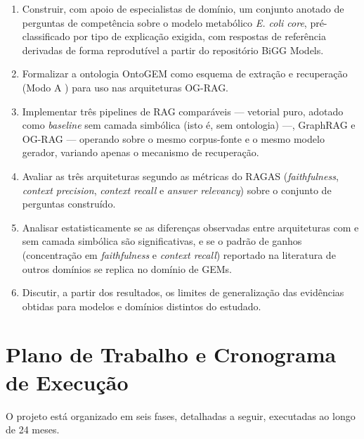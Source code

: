 \documentclass{article}
\begin{document}
	\begin{enumerate}
		\item Construir, com apoio de especialistas de domínio, um conjunto anotado de perguntas de competência sobre o modelo metabólico \textit{E. coli core}, pré-classificado por tipo de explicação exigida, com respostas de referência derivadas de forma reprodutível a partir do repositório BiGG Models.
		\item Formalizar a ontologia OntoGEM como esquema de extração e recuperação (Modo A \cite{sharma2025ograg}) para uso nas arquiteturas OG-RAG.
		\item Implementar três pipelines de RAG comparáveis --- vetorial puro, adotado como \textit{baseline} sem camada simbólica (isto é, sem ontologia) ---, GraphRAG e OG-RAG --- operando sobre o mesmo corpus-fonte e o mesmo modelo gerador, variando apenas o mecanismo de recuperação. %
		\item Avaliar as três arquiteturas segundo as métricas do RAGAS (\textit{faithfulness}, \textit{context precision}, \textit{context recall} e \textit{answer relevancy}) sobre o conjunto de perguntas construído.
		\item Analisar estatisticamente se as diferenças observadas entre arquiteturas com e sem camada simbólica são significativas, e se o padrão de ganhos (concentração em \textit{faithfulness} e \textit{context recall}) reportado na literatura de outros domínios se replica no domínio de GEMs.
		\item Discutir, a partir dos resultados, os limites de generalização das evidências obtidas para modelos e domínios distintos do estudado.
	\end{enumerate}
	
	\newpage
	
	\section{Plano de Trabalho e Cronograma de Execução}
	
	O projeto está organizado em seis fases, detalhadas a seguir, executadas ao longo de 24 meses.
	
\end{document}
